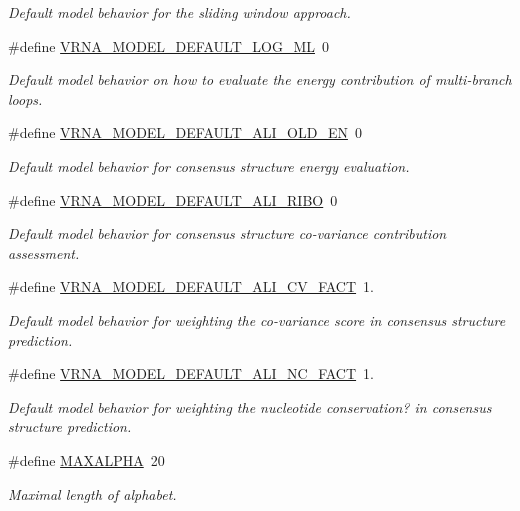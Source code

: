 \begin{DoxyCompactItemize}
\begin{DoxyCompactList}\small\item\em Default model behavior for the sliding window approach. \end{DoxyCompactList}\item 
\#define \mbox{\hyperlink{group__model__details_ga938f68463e84fe060aa6502f428a517d}{V\+R\+N\+A\+\_\+\+M\+O\+D\+E\+L\+\_\+\+D\+E\+F\+A\+U\+L\+T\+\_\+\+L\+O\+G\+\_\+\+ML}}~0
\begin{DoxyCompactList}\small\item\em Default model behavior on how to evaluate the energy contribution of multi-\/branch loops. \end{DoxyCompactList}\item 
\#define \mbox{\hyperlink{group__model__details_ga2a5bbfc1edf33077e39466d2d9807115}{V\+R\+N\+A\+\_\+\+M\+O\+D\+E\+L\+\_\+\+D\+E\+F\+A\+U\+L\+T\+\_\+\+A\+L\+I\+\_\+\+O\+L\+D\+\_\+\+EN}}~0
\begin{DoxyCompactList}\small\item\em Default model behavior for consensus structure energy evaluation. \end{DoxyCompactList}\item 
\#define \mbox{\hyperlink{group__model__details_ga64b3ab65a9ca42d4ad1d05e193083147}{V\+R\+N\+A\+\_\+\+M\+O\+D\+E\+L\+\_\+\+D\+E\+F\+A\+U\+L\+T\+\_\+\+A\+L\+I\+\_\+\+R\+I\+BO}}~0
\begin{DoxyCompactList}\small\item\em Default model behavior for consensus structure co-\/variance contribution assessment. \end{DoxyCompactList}\item 
\#define \mbox{\hyperlink{group__model__details_gaaaf3d73d6abc18d3889676952bfedb96}{V\+R\+N\+A\+\_\+\+M\+O\+D\+E\+L\+\_\+\+D\+E\+F\+A\+U\+L\+T\+\_\+\+A\+L\+I\+\_\+\+C\+V\+\_\+\+F\+A\+CT}}~1.
\begin{DoxyCompactList}\small\item\em Default model behavior for weighting the co-\/variance score in consensus structure prediction. \end{DoxyCompactList}\item 
\#define \mbox{\hyperlink{group__model__details_ga8f774daaafec28160c1ca5d09f2cbdba}{V\+R\+N\+A\+\_\+\+M\+O\+D\+E\+L\+\_\+\+D\+E\+F\+A\+U\+L\+T\+\_\+\+A\+L\+I\+\_\+\+N\+C\+\_\+\+F\+A\+CT}}~1.
\begin{DoxyCompactList}\small\item\em Default model behavior for weighting the nucleotide conservation? in consensus structure prediction. \end{DoxyCompactList}\item 
\mbox{\label{group__model__details_ga05a5ffe718aa431d97419a12fb082379}} 
\#define \mbox{\hyperlink{group__model__details_ga05a5ffe718aa431d97419a12fb082379}{M\+A\+X\+A\+L\+P\+HA}}~20
\begin{DoxyCompactList}\small\item\em Maximal length of alphabet. \end{DoxyCompactList}\end{DoxyCompactItemize}
